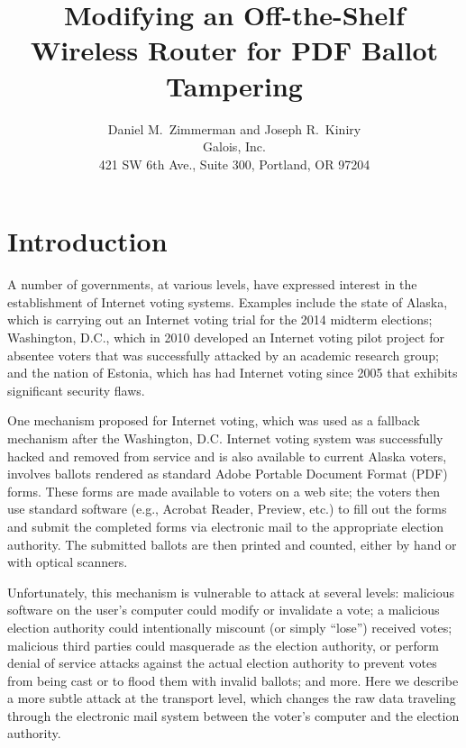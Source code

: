 \documentclass{article}
\newcommand{\eg}{e.g.,\xspace}
\newcommand{\etc}{etc.\xspace}
\begin{document}
\title{Modifying an Off-the-Shelf Wireless Router for PDF Ballot Tampering}
\author{Daniel M.~Zimmerman and Joseph R.~Kiniry \\ Galois, Inc. \\
  421 SW 6th Ave., Suite 300, Portland, OR 97204}

\maketitle


\section{Introduction}

A number of governments, at various levels, have expressed interest in
the establishment of Internet voting systems. Examples include the
state of Alaska, which is carrying out an Internet voting trial for
the 2014 midterm elections; Washington, D.C., which in 2010 developed
an Internet voting pilot project for absentee voters that was
successfully attacked by an academic research group;~\cite{DCVoting}
and the nation of Estonia, which has had Internet voting since 2005
that exhibits significant security flaws.~\cite{EstoniaEVoting}

One mechanism proposed for Internet voting, which was used as a
fallback mechanism after the Washington, D.C. Internet voting system
was successfully hacked and removed from service and is also available
to current Alaska voters, involves ballots rendered as standard Adobe
Portable Document Format (PDF) forms. These forms are made available
to voters on a web site; the voters then use standard software (\eg
Acrobat Reader, Preview, \etc) to fill out the forms and submit the
completed forms via electronic mail to the appropriate election
authority. The submitted ballots are then printed and counted, either
by hand or with optical scanners.

Unfortunately, this mechanism is vulnerable to attack at several
levels: malicious software on the user's computer could modify or
invalidate a vote; a malicious election authority could intentionally
miscount (or simply ``lose'') received votes; malicious third parties
could masquerade as the election authority, or perform denial of
service attacks against the actual election authority to prevent votes
from being cast or to flood them with invalid ballots; and more. Here
we describe a more subtle attack at the transport level, which changes
the raw data traveling through the electronic mail system between the
voter's computer and the election authority.
\end{document}
